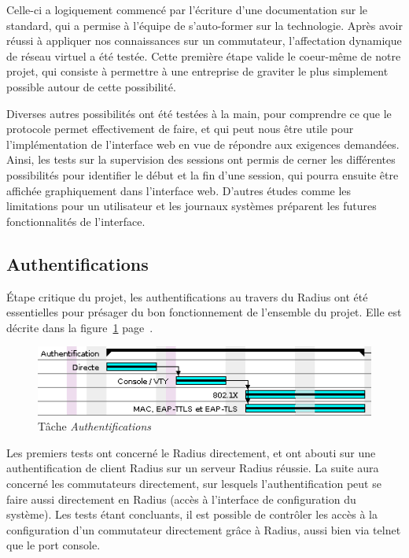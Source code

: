 Celle-ci a logiquement commencé par l'écriture d'une documentation sur le standard, qui a permise à l'équipe de s'auto-former sur la technologie. Après avoir réussi à appliquer nos connaissances sur un commutateur, l'affectation dynamique de réseau virtuel a été testée. Cette première étape valide le coeur-même de notre projet, qui consiste à permettre à une entreprise de graviter le plus simplement possible autour de cette possibilité.

Diverses autres possibilités ont été testées à la main, pour comprendre ce que le protocole permet effectivement de faire, et qui peut nous être utile pour l'implémentation de l'interface web en vue de répondre aux exigences demandées. Ainsi, les tests sur la supervision des sessions ont permis de cerner les différentes possibilités pour identifier le début et la fin d'une session, qui pourra ensuite être affichée graphiquement dans l'interface web. D'autres études comme les limitations pour un utilisateur et les journaux systèmes préparent les futures fonctionnalités de l'interface.

\subsection{Authentifications}

Étape critique du projet, les authentifications au travers du Radius ont été essentielles pour présager du bon fonctionnement de l'ensemble du projet. Elle est décrite dans la figure~\ref{gantt_auth} page~\pageref{gantt_auth}.

\begin{figure}[!h]
	\begin{center}
		\includegraphics[width=350pt]{img/gantt_auth.png}
	\end{center}
	\caption{Tâche \textit{Authentifications}}
	\label{gantt_auth}
\end{figure}

Les premiers tests ont concerné le Radius directement, et ont abouti sur une authentification de client Radius sur un serveur Radius réussie. La suite aura concerné les commutateurs directement, sur lesquels l'authentification peut se faire aussi directement en Radius (accès à l'interface de configuration du système). Les tests étant concluants, il est possible de contrôler les accès à la configuration d'un commutateur directement grâce à Radius, aussi bien via telnet que le port console.

